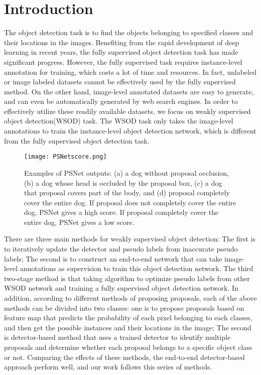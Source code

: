 \documentclass[final,3p,times,twocolumn]{elsarticle}
\begin{document}
\section{Introduction}
\label{sec1}
The object detection task is to find the objects belonging to specified classes and their locations in the images. Benefiting from the rapid development of deep learning in recent years, the fully supervised object detection task has made significant progress. However, the fully supervised task requires instance-level annotation for training, which costs a lot of time and resources. In fact, unlabeled or image labeled datasets cannot be effectively used by the fully supervised method. On the other hand, image-level annotated datasets are easy to generate, and can even be automatically generated by web search engines. In order to effectively utilize these readily available datasets, we focus on weakly supervised object detection(WSOD) task. The WSOD task only takes the image-level annotations to train the instance-level object detection network, which is different from the fully supervised object detection task. 

\begin{figure}[t]
	\begin{center}
\texttt{[image: PSNetscore.png]}
	\end{center}
	\caption{Examples of PSNet outputs: (a) a dog without proposal occlusion, (b) a dog whose head is occluded by the proposal box, (c) a dog that proposal covers part of the body, and (d) proposal completely cover the entire dog. If proposal does not completely cover the entire dog, PSNet gives a high score. If proposal completely cover the entire dog, PSNet gives a low score.}
	\label{fig:figure1}
\end{figure}

There are three main methods for weakly supervised object detection: The first is to iteratively update the detector and pseudo labels from inaccurate pseudo labels; The second is to construct an end-to-end network that can take image-level annotations as supervision to train this object detection network. The third two-stage method is that taking algorithm to optimize pseudo labels from other WSOD network and training a fully supervised object detection network. In addition, according to different methods of proposing proposals, each of the above methods can be divided into two classes: one is to propose proposals based on feature map that predicts the probability of each pixel belonging to each classes, and then get the possible instances and their locations in the image; The second is detector-based method that uses a trained detector to identify multiple proposals and determine whether each proposal belongs to a specific object class or not. Comparing the effects of these methods, the end-to-end detector-based approach perform well, and our work follows this series of methods.
\end{document}

